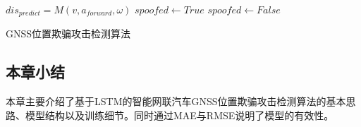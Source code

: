 \begin{algorithm}
    $dis_{predict}=M(v, a_{forward}, \omega)$\;
    {
        $spoofed\leftarrow True$\;
    }{
        $spoofed\leftarrow False$\;
    }
    \;
    \caption{GNSS位置欺骗攻击检测算法}
    \label{algo:dectection}
\end{algorithm}

\subsection{本章小结}
本章主要介绍了基于LSTM的智能网联汽车GNSS位置欺骗攻击检测算法的基本思路、模型结构以及训练细节。同时通过MAE与RMSE说明了模型的有效性。
